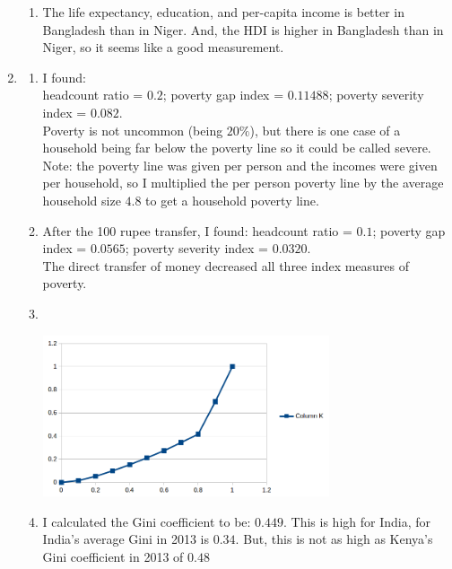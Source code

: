 \documentclass[12pt]{amsart}
\begin{document}
\begin{enumerate}
\begin{enumerate}
        \item The life expectancy, education, and per-capita income is
            better in Bangladesh than in Niger. And, the HDI is higher in
            Bangladesh than in Niger, so it seems like a good measurement.
    \end{enumerate}
    \item \begin{enumerate}
        \item I found:\\
            headcount ratio = $0.2$; poverty gap index = $0.11488$; poverty
            severity index = $0.082$.\\
            Poverty is not uncommon (being $20\%$), but there is one case
            of a household being far below the poverty line so it could be
            called severe.\\
            Note: the poverty line was given per person and the incomes
            were given per household, so I multiplied the per person
            poverty line by the average household size $4.8$ to get a
            household poverty line.
        \item After the 100 rupee transfer, I found:
            headcount ratio = $0.1$; poverty gap index = $0.0565$; poverty
            severity index = $0.0320$.\\
            The direct transfer of money decreased all three index measures
            of poverty.
        \item~\\\begin{center}\includegraphics[width=0.7\textwidth]{lorentz_curve.png}\end{center}
        \item I calculated the Gini coefficient to be: $0.449$. This is
            high for India, for India's average Gini in 2013 is $0.34$.
            But, this is not as high as Kenya's Gini coefficient in 2013 of
            $0.48$
    \end{enumerate}
\end{enumerate}
\end{document}
